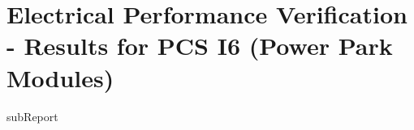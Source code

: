 \renewcommand{\DTRPcs}{I6PPM} %
\renewcommand{\DTRPcsLong}{I6 (Power Park Modules)}


    \section{Electrical Performance Verification - Results for PCS \DTRPcsLong}

    {{subReport}}
    \newpage

